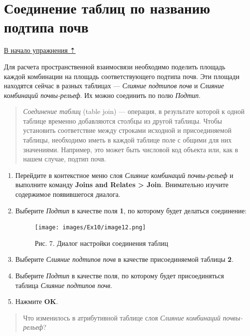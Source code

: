 \documentclass[12pt,]{book}
\begin{document}
\hypertarget{overlay-join}{%
\section{Соединение таблиц по названию подтипа почв}\label{overlay-join}}

\protect\hyperlink{overlay}{В начало упражнения ⇡}

Для расчета пространственной взаимосвязи необходимо поделить площадь каждой комбинации на площадь соответствующего подтипа почв. Эти площади находятся сейчас в разных таблицах --- \emph{Слияние подтипов почв} и \emph{Слияние комбинаций почвы-рельеф}. Их можно соединить по полю \emph{Подтип}.

\begin{quote}
\emph{Соединение таблиц} (table join) --- операция, в результате которой к одной таблице временно добавляются столбцы из другой таблицы. Чтобы установить соответствие между строками исходной и присоединяемой таблицы, необходимо иметь в каждой таблице поле с общими для них значениями. Например, это может быть числовой код объекта или, как в нашем случае, подтип почв.
\end{quote}

\begin{enumerate}
\def\labelenumi{\arabic{enumi}.}
\item
  Перейдите в контекстное меню слоя \emph{Слияние комбинаций почвы-рельеф} и выполните команду \textbf{Joins and Relates \textgreater{} Join}. Внимательно изучите содержимое появившегося диалога.
\item
  Выберите \emph{Подтип} в качестве поля \textbf{1}, по которому будет делаться соединение:

  \begin{figure}
  \centering
  \texttt{[image: images/Ex10/image12.png]}
  \caption{Рис. 7. Диалог настройки соединения таблиц}
  \end{figure}
\item
  Выберите \emph{Слияние подтипов почв} в качестве присоединяемой таблицы \textbf{2}.
\item
  Выберите \emph{Подтип} в качестве поля, по которому будет присоединяться таблица \emph{Слияние подтипов почв}.
\item
  Нажмите \textbf{OK}.
\end{enumerate}

\begin{quote}
Что изменилось в атрибутивной таблице слоя \emph{Слияние комбинаций почвы-рельеф}?
\end{quote}
\end{document}
